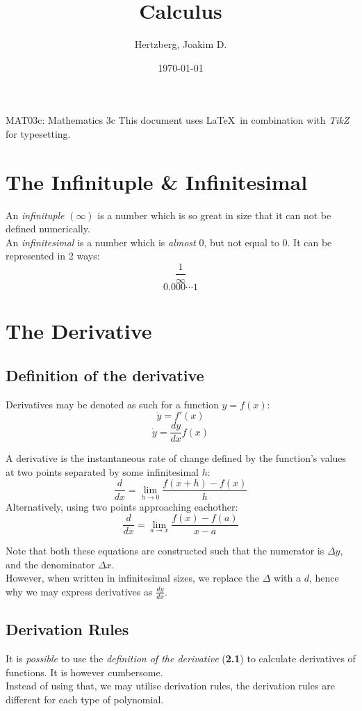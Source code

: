 \documentclass[12pt]{article}
\title{Calculus}
\author{Hertzberg, Joakim D.}
\date{\today}
\begin{document}
\maketitle
\begin{center}
MAT03c: Mathematics 3c
\vfill
This document uses \LaTeX\ in combination with \emph{TikZ} for typesetting.
\end{center}

\newpage
\tableofcontents
\thispagestyle{empty}
\setcounter{page}{0}
\newpage
\section{The Infinituple \& Infinitesimal}
An \emph{infinituple} $(\infty)$ is a number which is so great in size that it can not be defined numerically. \\ 
An \emph{infinitesimal} is a number which is \emph{almost} $0$, but not equal to $0$. It can be represented in 2 ways:
$$\frac{1}{\infty}$$
$$0.000\cdots1$$

\section{The Derivative}
\subsection{Definition of the derivative}

Derivatives may be denoted as such for a function $y = f(x)$:
$$\dot{y} = f'(x)$$
$$\dot{y} = \frac{dy}{dx}f(x)$$


A derivative is the instantaneous rate of change defined by the function's values at two points separated by some infinitesimal $h$:
\begin{equation}
	\frac{d}{dx} = \lim_{h\rightarrow0} \frac{f(x+h) - f(x)}{h}
\end{equation}
Alternatively, using two points approaching eachother:
\begin{equation}
	\frac{d}{dx} = \lim_{a\rightarrow x} \frac{f(x)-f(a)}{x-a}
\end{equation}

Note that both these equations are constructed such that the numerator is $\Delta y$, and the denominator $\Delta x$. \\
However, when written in infinitesimal sizes, we replace the $\Delta$ with a $d$, hence why we may express derivatives as $\frac{dy}{dx}$. 

\subsection{Derivation Rules}
It is \emph{possible} to use the \emph{definition of the derivative} (\textbf{2.1}) to calculate derivatives of functions. It is however cumbersome. \\
Instead of using that, we may utilise derivation rules, the derivation rules are different for each type of polynomial.
\end{document}
